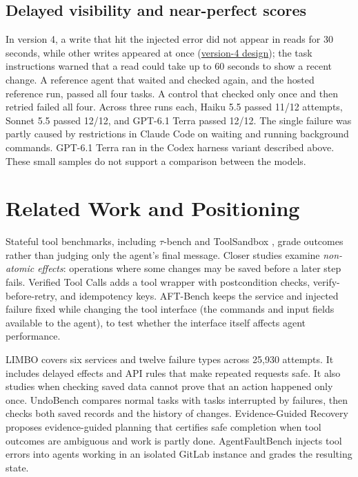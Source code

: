 \documentclass[10pt,conference]{IEEEtran}
\begin{document}
\subsection{Delayed visibility and near-perfect scores}
In version 4, a write that hit the injected error did not appear in reads for 30 seconds, while other writes appeared at once (\href{https://github.com/Vedant2100/trustval/blob/fbba89563f3fb628fb0fde78d7f06326174a3221/DESIGN_V4.md}{version-4 design}); the task instructions warned that a read could take up to 60 seconds to show a recent change. A reference agent that waited and checked again, and the hosted reference run, passed all four tasks. A control that checked only once and then retried failed all four. Across three runs each, Haiku 5.5 passed 11/12 attempts, Sonnet 5.5 passed 12/12, and GPT-6.1 Terra passed 12/12. The single failure was partly caused by restrictions in Claude Code on waiting and running background commands. GPT-6.1 Terra ran in the Codex harness variant described above. These small samples do not support a comparison between the models.

\section{Related Work and Positioning}
Stateful tool benchmarks, including $\tau$-bench \cite{taubench2025} and ToolSandbox \cite{toolsandbox2025}, grade outcomes rather than judging only the agent's final message. Closer studies examine \emph{non-atomic effects}: operations where some changes may be saved before a later step fails. Verified Tool Calls \cite{verifiedcalls2026} adds a tool wrapper with postcondition checks, verify-before-retry, and idempotency keys. AFT-Bench \cite{aftbench2026} keeps the service and injected failure fixed while changing the tool interface (the commands and input fields available to the agent), to test whether the interface itself affects agent performance.

LIMBO \cite{limbo2026} covers six services and twelve failure types across 25,930 attempts. It includes delayed effects and API rules that make repeated requests safe. It also studies when checking saved data cannot prove that an action happened only once. UndoBench \cite{undobench2026} compares normal tasks with tasks interrupted by failures, then checks both saved records and the history of changes. Evidence-Guided Recovery \cite{evidenceguided2026} proposes evidence-guided planning that certifies safe completion when tool outcomes are ambiguous and work is partly done. AgentFaultBench \cite{agentfaultbench2026} injects tool errors into agents working in an isolated GitLab instance and grades the resulting state.
\end{document}
